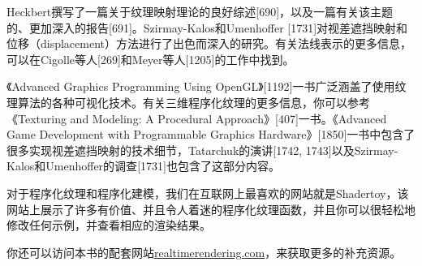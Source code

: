 \documentclass[
  paper=a4,
  ,captions=tableheading
]{scrartcl}
\begin{document}
Heckbert撰写了一篇关于纹理映射理论的良好综述{[}690{]}，以及一篇有关该主题的、更加深入的报告{[}691{]}。Szirmay-Kalos和Umenhoffer
{[}1731{]}对视差遮挡映射和位移（displacement）方法进行了出色而深入的研究。有关法线表示的更多信息，可以在Cigolle等人{[}269{]}和Meyer等人{[}1205{]}的工作中找到。

《Advanced Graphics Programming Using
OpenGL》{[}1192{]}一书广泛涵盖了使用纹理算法的各种可视化技术。有关三维程序化纹理的更多信息，你可以参考《Texturing
and Modeling: A Procedural Approach》{[}407{]}一书。《Advanced Game
Development with Programmable Graphics
Hardware》{[}1850{]}一书中包含了很多实现视差遮挡映射的技术细节，Tatarchuk的演讲{[}1742,
1743{]}以及Szirmay-Kalos和Umenhoffer的调查{[}1731{]}也包含了这部分内容。

对于程序化纹理和程序化建模，我们在互联网上最喜欢的网站就是Shadertoy，该网站上展示了许多有价值、并且令人着迷的程序化纹理函数，并且你可以很轻松地修改任何示例，并查看相应的渲染结果。

你还可以访问本书的配套网站\href{http://realtimerendering.com}{realtimerendering.com}，来获取更多的补充资源。
\end{document}
